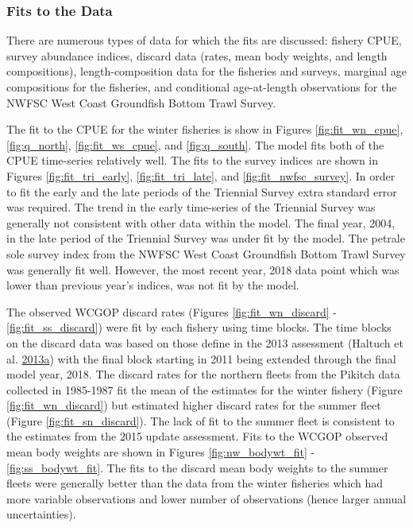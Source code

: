 \documentclass[12pt,]{article}
\begin{document}
\subsubsection{Fits to the Data}\label{fits-to-the-data}

There are numerous types of data for which the fits are discussed:
fishery CPUE, survey abundance indices, discard data (rates, mean body
weights, and length compositions), length-composition data for the
fisheries and surveys, marginal age compositions for the fisheries, and
conditional age-at-length observations for the NWFSC West Coast
Groundfish Bottom Trawl Survey.

The fit to the CPUE for the winter fisheries is show in Figures
\ref{fig:fit_wn_cpue}, \ref{fig:q_north}, \ref{fig:fit_ws_cpue}, and
\ref{fig:q_south}. The model fits both of the CPUE time-series
relatively well. The fits to the survey indices are shown in Figures
\ref{fig:fit_tri_early}, \ref{fig:fit_tri_late}, and
\ref{fig:fit_nwfsc_survey}. In order to fit the early and the late
periods of the Triennial Survey extra standard error was required. The
trend in the early time-series of the Triennial Survey was generally not
consistent with other data within the model. The final year, 2004, in
the late period of the Triennial Survey was under fit by the model. The
petrale sole survey index from the NWFSC West Coast Groundfish Bottom
Trawl Survey was generally fit well. However, the most recent year, 2018
data point which was lower than previous year's indices, was not fit by
the model.

The observed WCGOP discard rates (Figures \ref{fig:fit_wn_discard} -
\ref{fig:fit_ss_discard}) were fit by each fishery using time blocks.
The time blocks on the discard data was based on those define in the
2013 assessment (Haltuch et al.
\protect\hyperlink{ref-haltuch_california_2013}{2013}\protect\hyperlink{ref-haltuch_california_2013}{a})
with the final block starting in 2011 being extended through the final
model year, 2018. The discard rates for the northern fleets from the
Pikitch data collected in 1985-1987 fit the mean of the estimates for
the winter fishery (Figure \ref{fig:fit_wn_discard}) but estimated
higher discard rates for the summer fleet (Figure
\ref{fig:fit_sn_discard}). The lack of fit to the summer fleet is
consistent to the estimates from the 2015 update assessment. Fits to the
WCGOP observed mean body weights are shown in Figures
\ref{fig:nw_bodywt_fit} - \ref{fig:ss_bodywt_fit}. The fits to the
discard mean body weights to the summer fleets were generally better
than the data from the winter fisheries which had more variable
observations and lower number of observations (hence larger annual
uncertainties).
\end{document}
